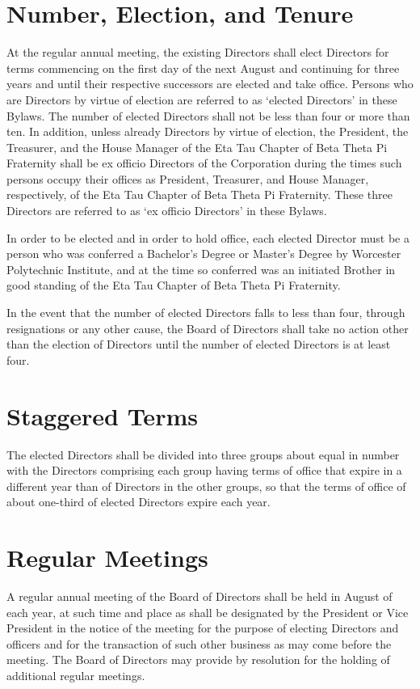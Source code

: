 \documentclass[12pt]{report}
\begin{document}
\section{Number, Election, and Tenure}

At the regular annual meeting, the existing Directors shall elect Directors for terms commencing on the first day of the next August and continuing for three years and until their respective successors are elected and take office. Persons who are Directors by virtue of election are referred to as `elected Directors' in these Bylaws. The number of elected Directors shall not be less than four or more than ten. In addition, unless already Directors by virtue of election, the President, the Treasurer, and the House Manager of the Eta Tau Chapter of Beta Theta Pi Fraternity shall be ex officio Directors of the Corporation during the times such persons occupy their offices as President, Treasurer, and House Manager, respectively, of the Eta Tau Chapter of Beta Theta Pi Fraternity. These three Directors are referred to as `ex officio Directors' in these Bylaws.

In order to be elected and in order to hold office, each elected Director must be a person who was conferred a Bachelor's Degree or Master's Degree by Worcester Polytechnic Institute, and at the time so conferred was an initiated Brother in good standing of the Eta Tau Chapter of Beta Theta Pi Fraternity.

In the event that the number of elected Directors falls to less than four, through resignations or any other cause, the Board of Directors shall take no action other than the election of Directors until the number of elected Directors is at least four.

\section{Staggered Terms}

The elected Directors shall be divided into three groups about equal in number with the Directors comprising each group having terms of office that expire in a different year than of Directors in the other groups, so that the terms of office of about one-third of elected Directors expire each year.

\section{Regular Meetings}

A regular annual meeting of the Board of Directors shall be held in August of each year, at such time and place as shall be designated by the President or Vice President in the notice of the meeting for the purpose of electing Directors and officers and for the transaction of such other business as may come before the meeting. The Board of Directors may provide by resolution for the holding of additional regular meetings.
\end{document}
